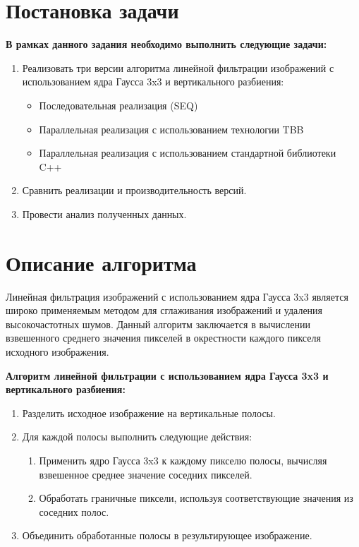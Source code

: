 \documentclass{report}
\begin{document}
\section*{Постановка задачи}
\par \textbf{В рамках данного задания необходимо выполнить следующие задачи:}
\begin{enumerate}
\item Реализовать три версии алгоритма линейной фильтрации изображений с использованием ядра Гаусса 3x3 и вертикального разбиения:
\begin{itemize}
\item Последовательная реализация (SEQ)
\item Параллельная реализация с использованием технологии TBB
\item Параллельная реализация с использованием стандартной библиотеки C++
\end{itemize}
\item Сравнить реализации и производительность версий.
\item Провести анализ полученных данных.
\end{enumerate}
\newpage

\section*{Описание алгоритма}
\par Линейная фильтрация изображений с использованием ядра Гаусса 3x3 является широко применяемым методом для сглаживания изображений и удаления высокочастотных шумов. Данный алгоритм заключается в вычислении взвешенного среднего значения пикселей в окрестности каждого пикселя исходного изображения.

\par \textbf{Алгоритм линейной фильтрации с использованием ядра Гаусса 3x3 и вертикального разбиения:}

\begin{enumerate}
\item Разделить исходное изображение на вертикальные полосы.
\item Для каждой полосы выполнить следующие действия:
\begin{enumerate}
\item Применить ядро Гаусса 3x3 к каждому пикселю полосы, вычисляя взвешенное среднее значение соседних пикселей.
\item Обработать граничные пиксели, используя соответствующие значения из соседних полос.
\end{enumerate}
\item Объединить обработанные полосы в результирующее изображение.
\end{enumerate}
\end{document}
